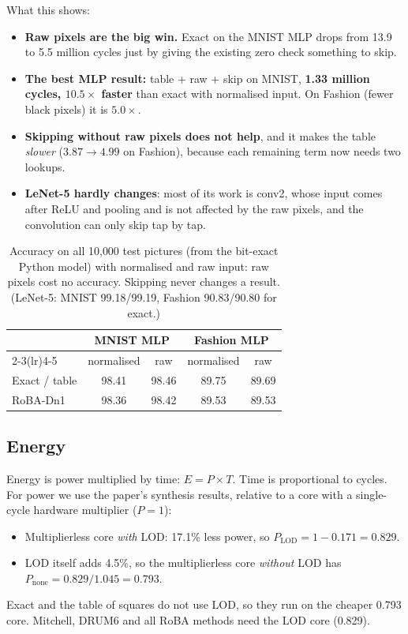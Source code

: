 What this shows:
\begin{itemize}
  \item \textbf{Raw pixels are the big win.} Exact on the MNIST MLP drops from 13.9 to 5.5 million cycles just
        by giving the existing zero check something to skip.
  \item \textbf{The best MLP result:} table + raw + skip on MNIST, \textbf{1.33 million cycles, $10.5\times$ faster}
        than exact with normalised input. On Fashion (fewer black pixels) it is $5.0\times$.
  \item \textbf{Skipping without raw pixels does not help}, and it makes the table \emph{slower}
        ($3.87\to4.99$ on Fashion), because each remaining term now needs two lookups.
  \item \textbf{LeNet-5 hardly changes}: most of its work is conv2, whose input comes after ReLU and pooling
        and is not affected by the raw pixels, and the convolution can only skip tap by tap.
\end{itemize}

\begin{table}[H]
\centering
\small
\begin{tabular}{lcccc}
\toprule
 & \multicolumn{2}{c}{MNIST MLP} & \multicolumn{2}{c}{Fashion MLP}\\
\cmidrule(lr){2-3}\cmidrule(lr){4-5}
 & normalised & raw & normalised & raw\\
\midrule
Exact / table & 98.41 & 98.46 & 89.75 & 89.69\\
RoBA-Dn1 & 98.36 & 98.42 & 89.53 & 89.53\\
\bottomrule
\end{tabular}
\caption{Accuracy on all 10{,}000 test pictures (from the bit-exact Python model) with normalised and raw
input: raw pixels cost no accuracy. Skipping never changes a result. (LeNet-5: MNIST 99.18/99.19, Fashion
90.83/90.80 for exact.)}
\end{table}

\subsection{Energy}\label{sec:energy}

Energy is power multiplied by time: $E = P\times T$. Time is proportional to cycles. For power we use the
paper's synthesis results, relative to a core with a single-cycle hardware multiplier ($P = 1$):
\begin{itemize}
  \item Multiplierless core \emph{with} LOD: 17.1\% less power, so $P_{\text{LOD}} = 1 - 0.171 = 0.829$.
  \item LOD itself adds 4.5\%, so the multiplierless core \emph{without} LOD has
        $P_{\text{none}} = 0.829/1.045 = 0.793$.
\end{itemize}
Exact and the table of squares do not use LOD, so they run on the cheaper 0.793 core. Mitchell, DRUM6 and all
RoBA methods need the LOD core (0.829).

